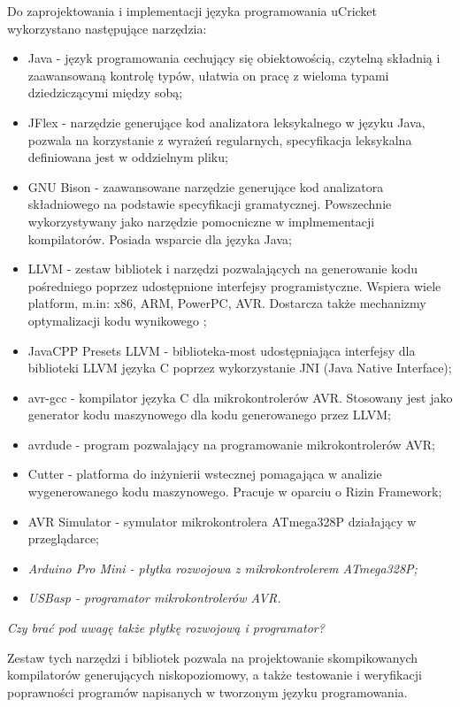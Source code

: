 Do zaprojektowania i implementacji języka programowania uCricket wykorzystano następujące narzędzia:
\begin{itemize}
\item Java - język programowania cechujący się obiektowością, czytelną składnią i zaawansowaną kontrolę typów, ułatwia on pracę z wieloma typami dziedziczącymi między sobą;
\item JFlex - narzędzie generujące kod analizatora leksykalnego w języku Java, pozwala na korzystanie z wyrażeń regularnych, specyfikacja leksykalna definiowana jest w oddzielnym pliku;
\item GNU Bison - zaawansowane narzędzie generujące kod analizatora składniowego na podstawie specyfikacji gramatycznej. Powszechnie wykorzystywany jako narzędzie pomocniczne w implmementacji kompilatorów. Posiada wsparcie dla języka Java;
\item LLVM - zestaw bibliotek i narzędzi pozwalających na generowanie kodu pośredniego poprzez udostępnione interfejsy programistyczne. Wspiera wiele platform, m.in: x86, ARM, PowerPC, AVR. Dostarcza także mechanizmy optymalizacji kodu wynikowego ;
\item JavaCPP Presets LLVM - biblioteka-most udostępniająca interfejsy dla biblioteki LLVM języka C poprzez wykorzystanie JNI (Java Native Interface);
\item avr-gcc - kompilator języka C dla mikrokontrolerów AVR. Stosowany jest jako generator kodu maszynowego dla kodu generowanego przez LLVM;
\item avrdude - program pozwalający na programowanie mikrokontrolerów AVR;
\item Cutter - platforma do inżynierii wstecznej pomagająca w analizie wygenerowanego kodu maszynowego. Pracuje w oparciu o Rizin Framework;
\item AVR Simulator - symulator mikrokontrolera ATmega328P działający w przeglądarce;
\item \textit{Arduino Pro Mini - płytka rozwojowa z mikrokontrolerem ATmega328P;}
\item \textit{USBasp - programator mikrokontrolerów AVR.}
\end{itemize}

\textit{Czy brać pod uwagę także płytkę rozwojową i programator?}

Zestaw tych narzędzi i bibliotek pozwala na projektowanie skompikowanych kompilatorów generujących niskopoziomowy, a także testowanie i weryfikacji poprawności programów napisanych w tworzonym języku programowania.


%
